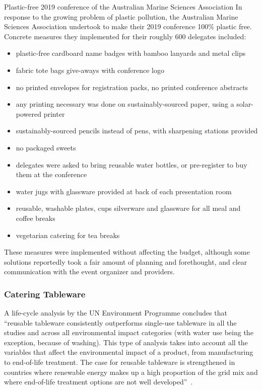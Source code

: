 \documentclass[../SustainableHEP.tex]{subfiles}
\begin{document}
\begin{bestpractice}{Plastic-free 2019 conference of the Australian Marine Sciences Association}%
    In response to the growing problem of plastic pollution, the Australian Marine Sciences Association undertook to make their 2019 conference 100\% plastic free. Concrete measures they implemented for their roughly 600 delegates included:
    \begin{itemize}
        \item plastic-free cardboard name badges with bamboo lanyards and metal clips
        \item fabric tote bags give-aways with conference logo
        \item no printed envelopes for registration packs, no printed conference abstracts
        \item any printing necessary was done on sustainably-sourced paper, using a solar-powered printer
        \item sustainably-sourced pencils instead of pens, with sharpening stations provided
        \item no packaged sweets
        \item delegates were asked to bring reusable water bottles, or pre-register to buy them at the conference
        \item water jugs with glassware provided at back of each presentation room
        \item reusable, washable plates, cups silverware and glassware for all meal and coffee breaks
        \item vegetarian catering for tea breaks
    \end{itemize}
    These measures were implemented without affecting the budget, although some solutions reportedly took a fair amount of planning and forethought, and clear communication with the event organizer and providers.
\end{bestpractice}

\subsubsection{Catering Tableware}
\label{sec:CateringTableware}
A life-cycle analysis by the UN Environment Programme concludes that “reusable tableware consistently outperforms single-use tableware in all the studies and across all environmental impact categories (with water use being the exception, because of washing). This type of analysis takes into account all the variables that affect the environmental impact of a product, from manufacturing to end-of-life treatment. The case for reusable tableware is strengthened in countries where renewable energy makes up a high proportion of the grid mix and where end-of-life treatment options are not well developed”~\cite{UNEP2021}. 
\end{document}
